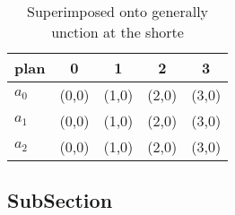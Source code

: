 \documentclass[a4paper]{article}
\begin{document}
\begin{table}
\begin{adjustbox}{width=0.6\columnwidth}
\begin{tabular}{|l|l|l|l|l|}
\hline
\textbf{plan} & \multicolumn{1}{c|}{\textbf{0}} & \multicolumn{1}{c|}{\textbf{1}} & \multicolumn{1}{c|}{\textbf{2}} & \multicolumn{1}{c|}{\textbf{3}} \\ \hline
\textbf{$a_0$}  & (0,0) & (1,0) & (2,0) & (3,0) \\ \hline
\textbf{$a_1$}  & (0,0) & (1,0) & (2,0) & (3,0) \\ \hline
\textbf{$a_2$}  & (0,0) & (1,0) & (2,0) & (3,0) \\ \hline
\end{tabular}
\end{adjustbox}
\caption{Superimposed onto generally unction at the shorte
}
\end{table}

\subsection{SubSection}
\end{document}
